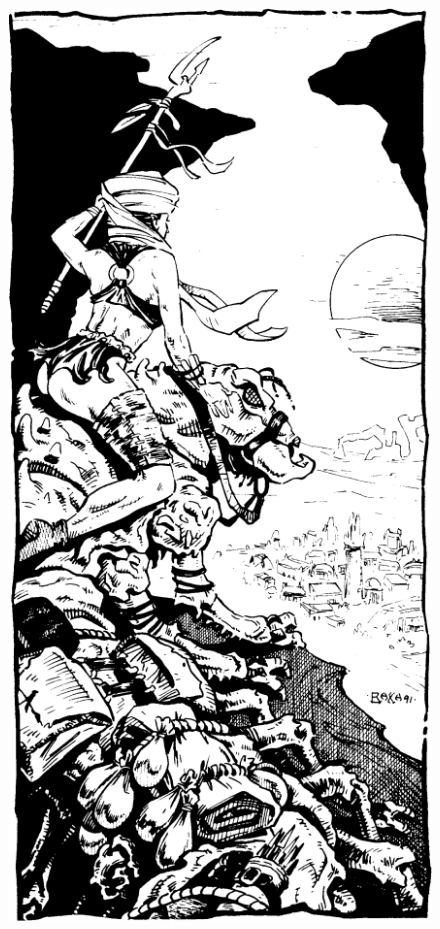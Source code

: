 \begin{figure}[h!]
\centering
\includegraphics[width=\columnwidth]{images/ranger-1.png}
\end{figure}

